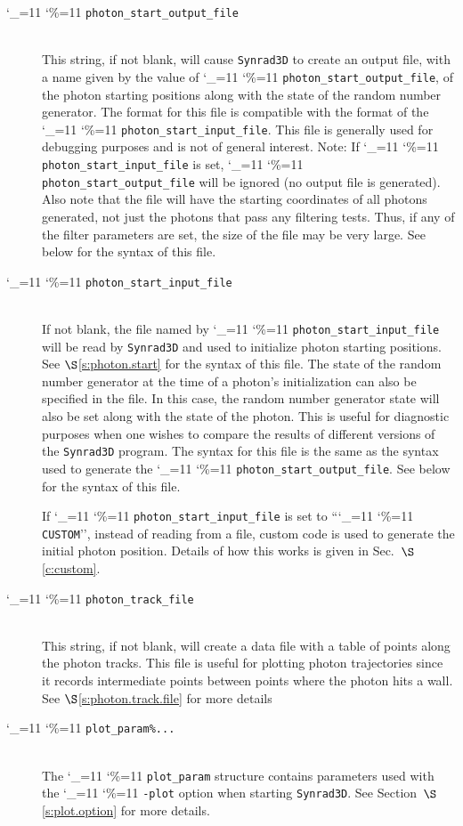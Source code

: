 \documentclass[11pt,openany]{report}
\newcommand{\sref}[1]{$\S$\ref{#1}}
\newcommand{\srthree}{\texttt{Synrad3D}\xspace}
\newcommand\ttcmd{\begingroup\catcode`\_=11 \catcode`\%=11 \dottcmd}
\newcommand\dottcmd[1]{\texttt{#1}\endgroup}
\newcommand{\vn}{\ttcmd}
\newcommand{\Newline}{\hfil \\}
\begin{document}
\begin{description}
  \item[\vn{photon_start_output_file}] \Newline
This string, if not blank, will cause \srthree to create an output file, with a name given
by the value of \vn{photon_start_output_file}, of the photon starting positions along with
the state of the random number generator. The format for this file is compatible with the
format of the \vn{photon_start_input_file}. This file is generally used for debugging
purposes and is not of general interest. Note: If \vn{photon_start_input_file} is set,
\vn{photon_start_output_file} will be ignored (no output file is generated). Also note
that the file will have the starting coordinates of all photons generated, not just the
photons that pass any filtering tests. Thus, if any of the filter parameters are set, the
size of the file may be very large. See below for the syntax of this file.

  \item[\vn{photon_start_input_file}] \Newline
If not blank, the file named by \vn{photon_start_input_file} will be read by \srthree and
used to initialize photon starting positions. See \sref{s:photon.start} for the syntax of
this file.  The state of the random number generator at the time of a photon's
initialization can also be specified in the file. In this case, the random number
generator state will also be set along with the state of the photon. This is useful for
diagnostic purposes when one wishes to compare the results of different versions of the
\srthree program. The syntax for this file is the same as the syntax used to generate the
\vn{photon_start_output_file}. See below for the syntax of this file.

If \vn{photon_start_input_file} is set to ``\vn{CUSTOM}'', instead of reading from a file, custom
code is used to generate the initial photon position. Details of how this works is given
in Sec.~\sref{c:custom}.

  \item[\vn{photon_track_file}] \Newline
This string, if not blank, will create a data file with a table of points along the photon tracks.
This file is useful for plotting photon trajectories since it records intermediate points between
points where the photon hits a wall.
See \sref{s:photon.track.file} for more details

  \item[\vn{plot_param\%...}] \Newline
The \vn{plot_param} structure contains parameters used with the \vn{-plot} option when
starting \srthree. See Section~\sref{s:plot.option} for more details.


\end{description}
\end{document}
